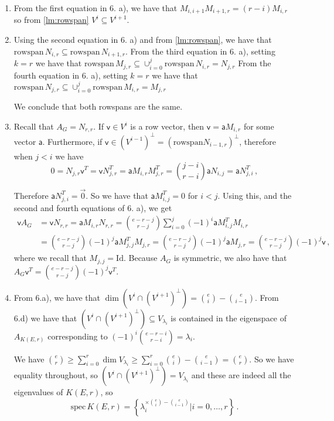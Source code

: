 \documentclass[kulak]{tplt}
\theoremstyle{definition}
\newcommand{\vv}{\mathsf{v}}
\newcommand{\va}{\mathsf{a}}
\newcommand{\rowspn}{\mathrm{rowspan}}
\newcommand{\Id}{\mathrm{Id}}
\newcommand{\spec}{\mathrm{spec}}
\begin{document}
\begin{enumerate}
\begin{enumerate}
\item 

From the first equation in 6. a), we have that $M_{i, i+1} M_{i+1, r} = (r-i)M_{i, r}$ so from \cref{lm:rowspan} $V^{i} \subseteq V^{i+1}$. 

\item
Using the second equation in 6. a) and from \cref{lm:rowspan}, we have that $\rowspn \,N_{i, r} \subseteq \rowspn \, N_{i+1, r}$.
From the third equation in 6. a), setting $k = r$ we have that $\rowspn \, M_{j, r} \subseteq \cup_{i=0}^j \rowspn \, N_{i, r} = N_{j, r}$
From the fourth equation in 6. a), setting $k = r$ we have that $\rowspn \, N_{j, r} \subseteq \cup_{i=0}^j \rowspn \, M_{i, r} = M_{j, r}$

We conclude that both rowspans are the same.


\item
Recall that $A_G = N_{r, r}$.
If $\vv \in V^i$ is a row vector, then $\vv = \va M_{i, r}$  for some vector $\va$.
Furthermore, if $\vv \in (V^{i-1})^{\perp} = (\rowspn N_{i-1, r})^{\perp} $, therefore when $j < i$ we have
$$ 0 = N_{j, r}\vv^T = \vv N_{j, r}^T =  \va M_{i, r} M_{j, r}^T = \binom{j-i}{r-i} \va N_{i, j} = \va N_{j, i}^T\, , $$

Therefore $\va N_{j, i}^T = \vec{0}$.
So we have that $\va M_{i, j}^T = 0 $ for $i <j$.
Using this, and the second and fourth equations of 6. a), we get
\begin{align*}
\vv A_G &= \vv N_{r, r} = \va M_{i, r} N_{r, r} = \binom{e-r-j}{r-j} \sum_{i=0}^j (-1)^i \va M_{i, j}^T M_{i, r}\\
&= \binom{e-r-j}{r-j} (-1)^j \va M_{j, j}^T M_{j, r} = \binom{e-r-j}{r-j} (-1)^j \va M_{j, r} = \binom{e-r-j}{r-j} (-1)^j \vv \,  ,
\end{align*}
where we recall that $M_{j, j} = \Id$.
Because $A_G$ is symmetric, we also have that $A_G \vv^T = \binom{e-r-j}{r-j} (-1)^j \vv^T$.

\item 
From 6.a), we have that $\dim (V^i \cap (V^{i+1})^{\perp}) = \binom{e}{i}-\binom{e}{i-1}$.
From 6.d) we have that $(V^i \cap (V^{i+1})^{\perp}) \subseteq V_{\lambda_i}$ is contained in the eigenspace of $A_{K(E, r)}$ corresponding to $(-1)^i\binom{e-r-i}{r-i} = \lambda_i$.

We have $\binom{e}{r} \geq \sum_{i=0}^r \dim V_{\lambda_i} \geq \sum_{i=0}^r \binom{e}{i}-\binom{e}{i-1} = \binom{e}{r}$.
So we have equality throughout, so $(V^i \cap (V^{i+1})^{\perp}) = V_{\lambda_i}$ and these are indeed all the eigenvalues of $K(E, r)$, so
$$\spec \, K(E, r) = \left\{  \lambda_i^{\times \binom{e}{i} - \binom{e}{i-1}} \Big| i = 0, \ldots, r\right\} \, . $$
\end{enumerate}

\end{enumerate}
\end{document}
